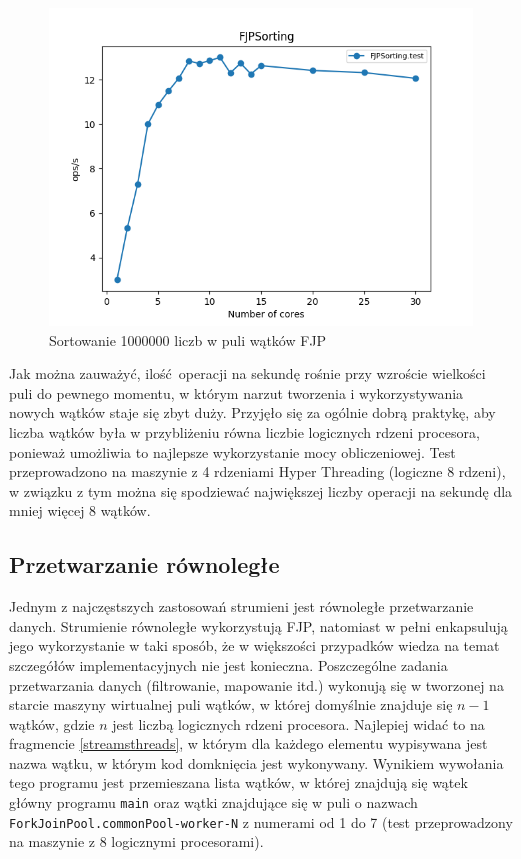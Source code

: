 \documentclass[12pt]{extarticle}
\begin{document}
\begin{figure}[h]
\centering
\includegraphics[width=13cm]{plots/FJPSorting}
\caption{Sortowanie 1000000 liczb w puli wątków FJP}
\label{fig:fjpsorting}
\end{figure}

    Jak można zauważyć, ilość operacji na sekundę rośnie przy wzroście wielkości puli do pewnego momentu, w którym narzut tworzenia i wykorzystywania nowych wątków staje się zbyt duży. Przyjęło się za ogólnie dobrą praktykę, aby liczba wątków była w przybliżeniu równa liczbie logicznych rdzeni procesora, ponieważ umożliwia to najlepsze wykorzystanie mocy obliczeniowej. Test przeprowadzono na maszynie z 4 rdzeniami Hyper Threading (logiczne 8 rdzeni), w związku z tym można się spodziewać największej liczby operacji na sekundę dla mniej więcej 8 wątków.



\subsection{Przetwarzanie równoległe}

    Jednym z najczęstszych zastosowań strumieni jest równoległe przetwarzanie danych. Strumienie równoległe wykorzystują FJP, natomiast w pełni enkapsulują jego wykorzystanie w taki sposób, że w większości przypadków wiedza na temat szczegółów implementacyjnych nie jest konieczna. Poszczególne zadania przetwarzania danych (filtrowanie, mapowanie itd.) wykonują się w tworzonej na starcie maszyny wirtualnej puli wątków, w której domyślnie znajduje się $ n-1 $ wątków, gdzie $ n $ jest liczbą logicznych rdzeni procesora. Najlepiej widać to na fragmencie \ref{streamsthreads}, w którym dla każdego elementu wypisywana jest nazwa wątku, w którym kod domknięcia jest wykonywany.  Wynikiem wywołania tego programu jest przemieszana lista wątków, w której znajdują się wątek główny programu \texttt{main} oraz wątki znajdujące się w puli o nazwach \texttt{ForkJoinPool.commonPool-worker-N} z numerami od 1 do 7 (test przeprowadzony na maszynie z 8 logicznymi procesorami).
\end{document}
